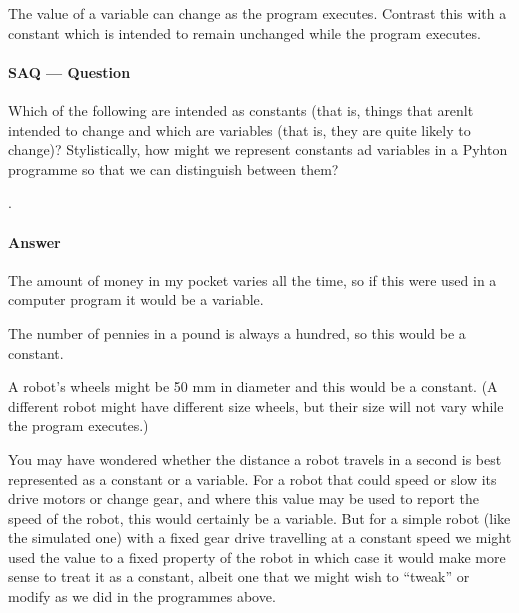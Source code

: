 \documentclass[letterpaper,10pt,english]{sphinxmanual}
\begin{document}
{The value of a variable can change as the program executes. Contrast this with a constant which is intended to remain unchanged while the program executes.


\paragraph{SAQ — Question}
\label{\detokenize{content/01_Robot_Lab/Section_00_02:SAQ-_u2014-Question}}
Which of the following are intended as constants (that is, things that arenlt intended to change and which are variables (that is, they are quite likely to change)? Stylistically, how might we represent constants ad variables in a Pyhton programme so that we can distinguish between them?




.


\paragraph{Answer}
\label{\detokenize{content/01_Robot_Lab/Section_00_02:id2}}

The amount of money in my pocket varies all the time, so if this were used in a computer program it would be a variable.

The number of pennies in a pound is always a hundred, so this would be a constant.

A robot’s wheels might be 50 mm in diameter and this would be a constant. (A different robot might have different size wheels, but their size will not vary while the program executes.)

You may have wondered whether the distance a robot travels in a second is best represented as a constant or a variable. For a robot that could speed or slow its drive motors or change gear, and where this value may be used to report the speed of the robot, this would certainly be a variable. But for a simple robot (like the simulated one) with a fixed gear drive travelling at a constant speed we might used the value to  a fixed property of the robot in which case it would make more sense
to treat it as a constant, albeit one that we might wish to “tweak” or modify as we did in the programmes above.

}
\end{document}
